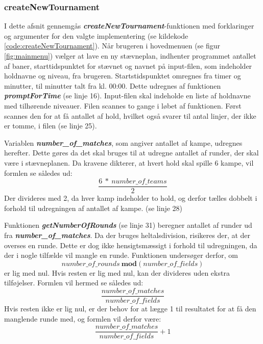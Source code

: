\subsubsection{createNewTournament}\label{afsnit:createNewTournament}
I dette afsnit gennemgås \textbf{\textit{createNewTournament}}-funktionen med forklaringer og argumenter for den valgte implementering (se kildekode \ref{code:createNewTournament}). Når brugeren i hovedmenuen (se figur \ref{fig:mainmenu}) vælger at lave en ny stævneplan, indhenter programmet antallet af baner, starttidspunktet for stævnet og navnet på input-filen, som indeholder holdnavne og niveau, fra brugeren. 
Startstidspunktet omregnes fra timer og minutter, til minutter talt fra kl. 00:00. Dette udregnes af funktionen \textbf{\textit{promptForTime}} (se linje 16).
Input-filen skal indeholde en liste af holdnavne med tilhørende niveauer. Filen scannes to gange i løbet af funktionen. Først scannes den for at få antallet af hold, hvilket også svarer til antal linjer, der ikke er tomme, i filen (se linje 25).
\par
Variablen \textbf{\textit{number\_of\_matches}}, som angiver antallet af kampe, udregnes herefter. Dette gøres da det skal bruges til at udregne antallet af runder, der skal være i stævneplanen. Da kravene dikterer, at hvert hold skal spille 6 kampe, vil formlen se således ud:
\[\frac{6\ * \ number\_of\_teams}{2}\]
Der divideres med 2, da hver kamp indeholder to hold, og derfor tælles dobbelt i forhold til udregningen af antallet af kampe. (se linje 28)
\par
Funktionen \textbf{\textit{getNumberOfRounds}} (se linje 31) beregner antallet af runder ud fra \textbf{\textit{number\_of\_matches}}. Da der bruges heltalsdivision, risikeres der, at der overses en runde. Dette er dog ikke hensigtsmæssigt i forhold til udregningen, da der i nogle tilfælde vil mangle en runde. Funktionen undersøger derfor, om\[number\_of\_rounds \ \textbf{mod}(number\_of\_fields)\] er lig med nul. Hvis resten er lig med nul, kan der divideres uden ekstra tilføjelser. Formlen vil hermed se således ud:
\[\frac{number\_of\_matches}{number\_of\_fields}\]
Hvis resten ikke er lig nul, er der behov for at lægge 1 til resultatet for at få den manglende runde med, og formlen vil derfor være:
\[\frac{number\_of\_matches}{number\_of\_fields} + 1\]
\clearpage


